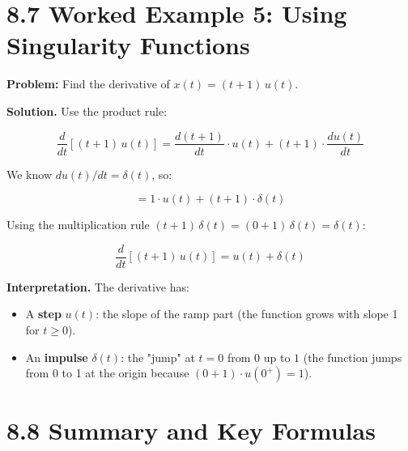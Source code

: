 \documentclass[11pt]{article}
\begin{document}
\section*{8.7 Worked Example 5: Using Singularity Functions}

\textbf{Problem:} Find the derivative of $x(t) = (t + 1)\,u(t)$.

\textbf{Solution.} Use the product rule:

\[\frac{d}{dt}\!\left[(t+1)\,u(t)\right] = \frac{d(t+1)}{dt}\cdot u(t) + (t+1)\cdot \frac{d u(t)}{dt}\]

We know $du(t)/dt = \delta(t)$, so:

\[= 1\cdot u(t) + (t+1)\cdot\delta(t)\]

Using the multiplication rule $(t+1)\,\delta(t) = (0+1)\,\delta(t) = \delta(t)$:

\[\boxed{\;\frac{d}{dt}\!\left[(t+1)\,u(t)\right] = u(t) + \delta(t)\;}\]

\textbf{Interpretation.} The derivative has:

\begin{itemize}
  \item A \textbf{step} $u(t)$: the slope of the ramp part (the function grows with slope 1 for $t \geq 0$).
  \item An \textbf{impulse} $\delta(t)$: the "jump" at $t=0$ from $0$ up to $1$ (the function jumps from 0 to 1 at the origin because $(0+1)\cdot u(0^+) = 1$).
\end{itemize}

\section*{8.8 Summary and Key Formulas}
\end{document}
